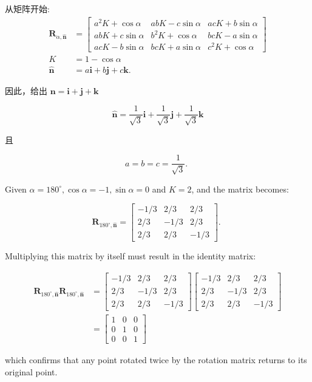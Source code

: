 从矩阵开始:
$$
\begin{aligned}
\mathbf{R}_{\alpha, \hat{\mathbf{n}}} & =\left[\begin{array}{ccc}
a^{2} K+\cos \alpha & a b K-c \sin \alpha & a c K+b \sin \alpha \\
a b K+c \sin \alpha & b^{2} K+\cos \alpha & b c K-a \sin \alpha \\
a c K-b \sin \alpha & b c K+a \sin \alpha & c^{2} K+\cos \alpha
\end{array}\right] \\
K & =1-\cos \alpha \\
\hat{\mathbf{n}} & =a \mathbf{i}+b \mathbf{j}+c \mathbf{k} .
\end{aligned}
$$

因此，给出 $\mathbf{n}=\mathbf{i}+\mathbf{j}+\mathbf{k}$

$$
\hat{\mathbf{n}}=\frac{1}{\sqrt{3}} \mathbf{i}+\frac{1}{\sqrt{3}} \mathbf{j}+\frac{1}{\sqrt{3}} \mathbf{k}
$$

且

$$
a=b=c=\frac{1}{\sqrt{3}} \text {. }
$$

Given $\alpha=180^{\circ}, \cos \alpha=-1, \sin \alpha=0$ and $K=2$, and the matrix becomes:

$$
\mathbf{R}_{180^{\circ}, \hat{\mathbf{n}}}=\left[\begin{array}{ccc}
-1 / 3 & 2 / 3 & 2 / 3 \\
2 / 3 & -1 / 3 & 2 / 3 \\
2 / 3 & 2 / 3 & -1 / 3
\end{array}\right] \text {. }
$$

Multiplying this matrix by itself must result in the identity matrix:

$$
\begin{aligned}
\mathbf{R}_{180^{\circ}, \hat{\mathbf{n}}} \mathbf{R}_{180^{\circ}, \hat{\mathbf{n}}} & =\left[\begin{array}{ccc}
-1 / 3 & 2 / 3 & 2 / 3 \\
2 / 3 & -1 / 3 & 2 / 3 \\
2 / 3 & 2 / 3 & -1 / 3
\end{array}\right]\left[\begin{array}{ccc}
-1 / 3 & 2 / 3 & 2 / 3 \\
2 / 3 & -1 / 3 & 2 / 3 \\
2 / 3 & 2 / 3 & -1 / 3
\end{array}\right] \\
& =\left[\begin{array}{ccc}
1 & 0 & 0 \\
0 & 1 & 0 \\
0 & 0 & 1
\end{array}\right]
\end{aligned}
$$

which confirms that any point rotated twice by the rotation matrix returns to its original point.
